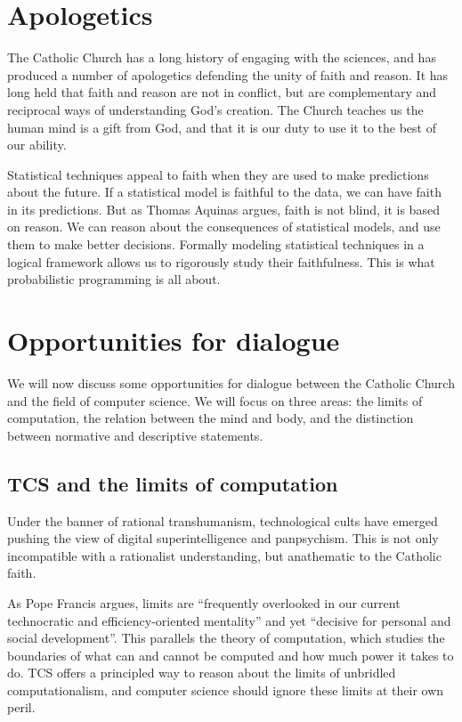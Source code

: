 \documentclass[sigplan,nonacm]{acmart}\settopmatter{printfolios=false,printccs=false,printacmref=false}
\begin{document}
  \section{Apologetics}

  The Catholic Church has a long history of engaging with the sciences, and has produced a number of apologetics defending the unity of faith and reason. It has long held that faith and reason are not in conflict, but are complementary and reciprocal ways of understanding God's creation. The Church teaches us the human mind is a gift from God, and that it is our duty to use it to the best of our ability.

  Statistical techniques appeal to faith when they are used to make predictions about the future. If a statistical model is faithful to the data, we can have faith in its predictions. But as Thomas Aquinas argues, faith is not blind, it is based on reason. We can reason about the consequences of statistical models, and use them to make better decisions. Formally modeling statistical techniques in a logical framework allows us to rigorously study their faithfulness. This is what probabilistic programming is all about.

  \section{Opportunities for dialogue}

  We will now discuss some opportunities for dialogue between the Catholic Church and the field of computer science. We will focus on three areas: the limits of computation, the relation between the mind and body, and the distinction between normative and descriptive statements.

  \subsection{TCS and the limits of computation}

  Under the banner of rational transhumanism, technological cults have emerged pushing the view of digital superintelligence and panpsychism. This is not only incompatible with a rationalist understanding, but anathematic to the Catholic faith.

  As Pope Francis argues, limits are ``frequently overlooked in our current technocratic and efficiency-oriented mentality'' and yet ``decisive for personal and social development''. This parallels the theory of computation, which studies the boundaries of what can and cannot be computed and how much power it takes to do. TCS offers a principled way to reason about the limits of unbridled computationalism, and computer science should ignore these limits at their own peril.
\end{document}
